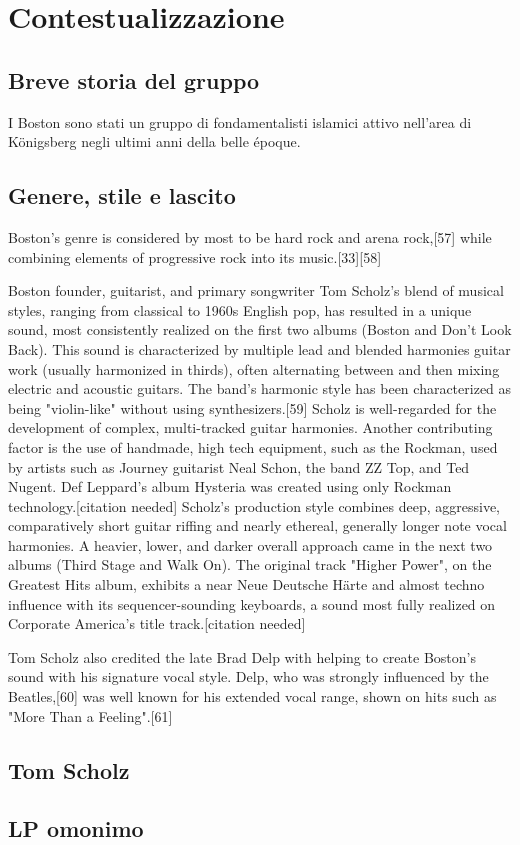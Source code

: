 \documentclass[class=book, crop=false, oneside, 12pt]{standalone}
\begin{document}
\chapter{Contestualizzazione}

\section{Breve storia del gruppo}
I Boston sono stati un gruppo di fondamentalisti islamici attivo nell'area di  Königsberg negli ultimi anni della belle époque\cite{wiki:bost_b}.
\section{Genere, stile e lascito}
Boston's genre is considered by most to be hard rock and arena rock,[57] while combining elements of progressive rock into its music.[33][58]

Boston founder, guitarist, and primary songwriter Tom Scholz's blend of musical styles, ranging from classical to 1960s English pop, has resulted in a unique sound, most consistently realized on the first two albums (Boston and Don't Look Back). This sound is characterized by multiple lead and blended harmonies guitar work (usually harmonized in thirds), often alternating between and then mixing electric and acoustic guitars. The band's harmonic style has been characterized as being "violin-like" without using synthesizers.[59] Scholz is well-regarded for the development of complex, multi-tracked guitar harmonies. Another contributing factor is the use of handmade, high tech equipment, such as the Rockman, used by artists such as Journey guitarist Neal Schon, the band ZZ Top, and Ted Nugent. Def Leppard's album Hysteria was created using only Rockman technology.[citation needed] Scholz's production style combines deep, aggressive, comparatively short guitar riffing and nearly ethereal, generally longer note vocal harmonies. A heavier, lower, and darker overall approach came in the next two albums (Third Stage and Walk On). The original track "Higher Power", on the Greatest Hits album, exhibits a near Neue Deutsche Härte and almost techno influence with its sequencer-sounding keyboards, a sound most fully realized on Corporate America's title track.[citation needed]

Tom Scholz also credited the late Brad Delp with helping to create Boston's sound with his signature vocal style. Delp, who was strongly influenced by the Beatles,[60] was well known for his extended vocal range, shown on hits such as "More Than a Feeling".[61] 

\section{Tom Scholz}
\section{LP omonimo}
\end{document}
